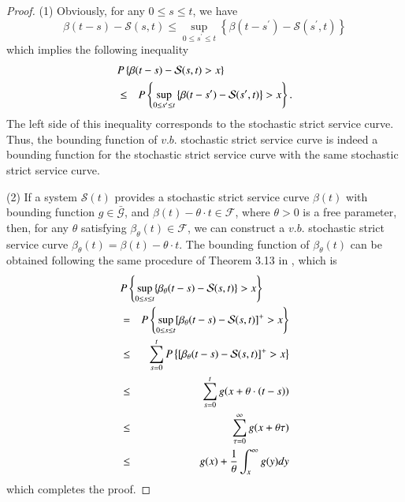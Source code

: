 \documentclass[paper]{ieice}
\newtheorem{proof}{Proof}
\begin{document}
\begin{proof}
(1) Obviously, for any $0\leq s\leq t$, we have
$$\beta(t-s)-\mathcal{S}(s,t)\leq \sup_{0\leq s^\prime\leq t}\left\{\beta(t-s^\prime)-\mathcal{S}(s^\prime,t)\right\}$$
which implies the following inequality
\begin{eqnarray*}
\lefteqn{P\left\{\beta(t-s)-\mathcal{S}(s,t)>x\right\}}\\
&\leq& P\left\{\sup_{0\leq s^\prime\leq t}\left\{\beta(t-s^\prime)-\mathcal{S}(s^\prime,t)\right\}>x\right\}.
\end{eqnarray*}
The left side of this inequality corresponds to the stochastic strict service curve. Thus, the bounding function of $v.b.$ stochastic strict service curve is indeed a bounding function for the stochastic strict service curve with the same stochastic strict service curve.

(2) If a system $\mathcal{S}(t)$ provides a stochastic strict service curve $\beta(t)$ with bounding function $g\in\bar{\mathcal{G}}$, and $\beta(t)-\theta \cdot t\in\mathcal{F}$, where $\theta>0$ is a free parameter, then, for any $\theta$ satisfying $\beta_{\theta}(t)\in\mathcal{F}$, we can construct a $v.b.$ stochastic strict service curve $\beta_{\theta}(t)=\beta(t)-\theta \cdot t$. The bounding function of $\beta_\theta(t)$ can be obtained following the same procedure of Theorem 3.13 in \cite{JiangLiu-15877}, which is
\begin{eqnarray*}
\lefteqn{P\left\{\sup_{0\leq s\leq t}\{\beta_{\theta}(t-s)-\mathcal{S}(s,t)\}>x\right\}}\\
&= &P\left\{\sup_{0\leq s\leq t}[\beta_{\theta}(t-s)-\mathcal{S}(s,t)]^+>x\right\}\\
&\leq &\sum_{s=0}^t P\left\{[\beta_{\theta}(t-s)-\mathcal{S}(s,t)]^+>x\right\}\\
&\leq &\sum_{s=0}^t g(x+\theta\cdot(t-s))\\
&\leq & \sum_{\tau=0}^\infty g(x+\theta\tau)\\
&\leq & g(x)+\frac{1}{\theta}\int_{x}^\infty g(y)dy
\end{eqnarray*}
which completes the proof.\QED
\end{proof}
\end{document}
